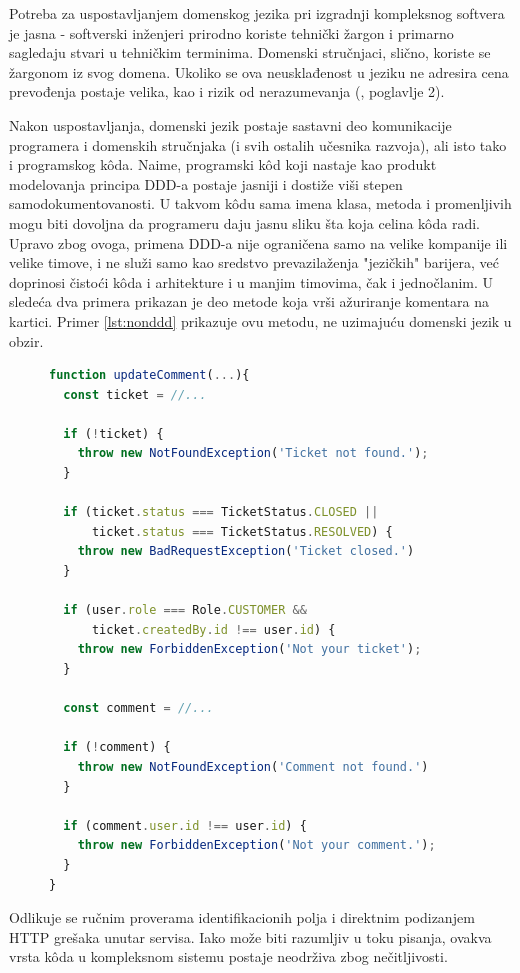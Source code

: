 \documentclass[12pt,oneside]{memoir}
\begin{document}
Potreba za uspostavljanjem domenskog jezika pri izgradnji kompleksnog softvera je jasna - softverski inženjeri prirodno koriste tehnički žargon i primarno sagledaju stvari u tehničkim terminima. Domenski stručnjaci, slično, koriste se žargonom iz svog domena. Ukoliko se ova neusklađenost u jeziku ne adresira cena prevođenja postaje velika, kao i rizik od nerazumevanja (\cite{dddfull}, poglavlje 2). 

Nakon uspostavljanja, domenski jezik postaje sastavni deo komunikacije programera i domenskih stručnjaka (i svih ostalih učesnika razvoja), ali isto tako i programskog k\^{o}da. Naime, programski k\^{o}d koji nastaje kao produkt modelovanja principa DDD-a postaje jasniji i dostiže viši stepen samodokumentovanosti. U takvom k\^{o}du sama imena klasa, metoda i promenljivih mogu biti dovoljna da programeru daju jasnu sliku šta koja celina k\^{o}da radi. Upravo zbog ovoga, primena DDD-a nije ograničena samo na velike kompanije ili velike timove, i ne služi samo kao sredstvo prevazilaženja "jezičkih" barijera, već doprinosi čistoći k\^{o}da i arhitekture i u manjim timovima, čak i jednočlanim. U sledeća dva primera prikazan je deo metode koja vrši ažuriranje komentara na kartici. Primer \ref{lst:nonddd} prikazuje ovu metodu, ne uzimajuću domenski jezik u obzir.


\begin{figure}[h]
\begin{lstlisting}[language=JavaScript, style=ES6, caption={K\^{o}d koji nije na domenskom jeziku}, label={lst:nonddd}]
function updateComment(...){
  const ticket = //...
  
  if (!ticket) {
    throw new NotFoundException('Ticket not found.');
  }

  if (ticket.status === TicketStatus.CLOSED ||
      ticket.status === TicketStatus.RESOLVED) {
    throw new BadRequestException('Ticket closed.')
  }

  if (user.role === Role.CUSTOMER &&
      ticket.createdBy.id !== user.id) {
    throw new ForbiddenException('Not your ticket');
  }
  
  const comment = //...
  
  if (!comment) {
    throw new NotFoundException('Comment not found.')
  }
  
  if (comment.user.id !== user.id) {
    throw new ForbiddenException('Not your comment.');
  }
}
\end{lstlisting}
\end{figure}
\newpage
Odlikuje se ručnim proverama identifikacionih polja i direktnim podizanjem HTTP grešaka unutar servisa. Iako može biti razumljiv u toku pisanja, ovakva vrsta k\^{o}da u kompleksnom sistemu postaje neodrživa zbog nečitljivosti.
\end{document}
